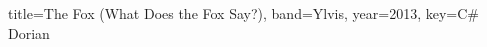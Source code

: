 \documentclass{bekki-leadsheet}
\begin{document}
\begin{song}{title={The Fox (What Does the Fox Say?)}, band={Ylvis}, year={2013}, key={C# Dorian}}



\end{song}
\end{document}
